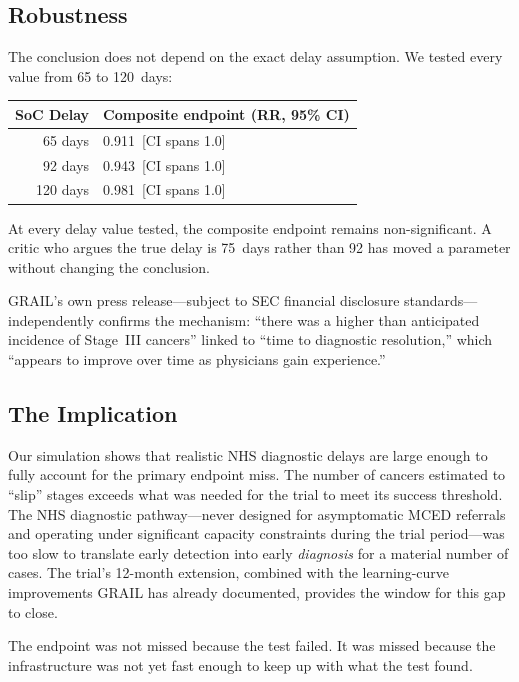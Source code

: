 \documentclass[11pt,a4paper]{article}
\begin{document}
\subsection*{Robustness}

The conclusion does not depend on the exact delay assumption. We
tested every value from 65 to 120~days:

\begin{center}\small
\begin{tabular}{rl}
\toprule
SoC Delay & Composite endpoint (RR, 95\% CI) \\
\midrule
65 days  & 0.911 \,[CI spans 1.0] \\
92 days  & 0.943 \,[CI spans 1.0] \\
120 days & 0.981 \,[CI spans 1.0] \\
\bottomrule
\end{tabular}
\end{center}

\noindent At every delay value tested, the composite endpoint remains
non-significant. A critic who argues the true delay is 75~days
rather than 92 has moved a parameter without changing the conclusion.

GRAIL's own press release---subject to SEC financial disclosure
standards---independently confirms the mechanism: ``there was a
higher than anticipated incidence of Stage~III cancers'' linked to
``time to diagnostic resolution,'' which ``appears to improve over
time as physicians gain experience.''

\subsection*{The Implication}

Our simulation shows that realistic NHS diagnostic delays are large
 enough to fully account for the primary endpoint miss. The number
  of cancers estimated to “slip” stages exceeds what was needed for
   the trial to meet its success threshold.
 The NHS
diagnostic pathway---never designed for asymptomatic MCED referrals
and operating under significant capacity constraints during the trial
period---was too slow to translate early detection into early
\emph{diagnosis} for a material number of cases. The trial's 12-month
extension, combined with the learning-curve improvements GRAIL has
already documented, provides the window for this gap to close.

The endpoint was not missed because the test failed. It was missed
because the infrastructure was not yet fast enough to keep up with
what the test found.
\end{document}
